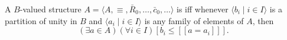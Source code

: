 A $B$-valued structure $A = \langle A, \equiv, \bar{R}_0, \ldots, \bar{c}_0, \ldots \rangle$ is  iff whenever $\langle b_i \mid i \in I \rangle$ is a partition of unity in $B$ and $\langle a_i \mid i \in I \rangle$ is any family of elements of $A$, then
$$(\exists a \in A)(\forall i \in I)[b_i \leq [\![a = a_i]\!]].$$
